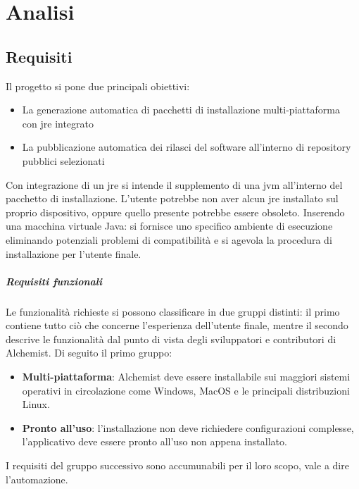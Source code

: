 \chapter{Analisi}

\section{Requisiti}

Il progetto si pone due principali obiettivi:
\begin{itemize}
	\setlength\itemsep{0.8em}
	\item La generazione automatica di pacchetti di installazione multi-piattaforma \\ con \ac{jre} integrato
	\item La pubblicazione automatica dei rilasci del software all'interno di repository pubblici selezionati
\end{itemize}
Con integrazione di un \ac{jre} si intende il supplemento di una \ac{jvm} all'interno del pacchetto di installazione.
L'utente potrebbe non aver alcun \ac{jre} installato sul proprio dispositivo, oppure quello presente potrebbe essere obsoleto. Inserendo una macchina virtuale Java: si fornisce uno specifico ambiente di esecuzione eliminando potenziali problemi di compatibilità e si agevola la procedura di installazione per l'utente finale.

\paragraph{Requisiti funzionali}

Le funzionalità richieste si possono classificare in due gruppi distinti: il primo contiene tutto ciò che concerne l'esperienza dell'utente finale, mentre il secondo descrive le funzionalità dal punto di vista degli sviluppatori e contributori di Alchemist. Di seguito il primo gruppo:
\begin{itemize}
	\item \textbf{Multi-piattaforma}: Alchemist deve essere installabile sui maggiori sistemi operativi in circolazione come Windows, MacOS e le principali distribuzioni Linux.
	\item \textbf{Pronto all'uso}: l'installazione non deve richiedere configurazioni complesse, l'applicativo deve essere pronto all'uso non appena installato.
\end{itemize}

I requisiti del gruppo successivo sono accumunabili per il loro scopo, vale a dire l'automazione.

